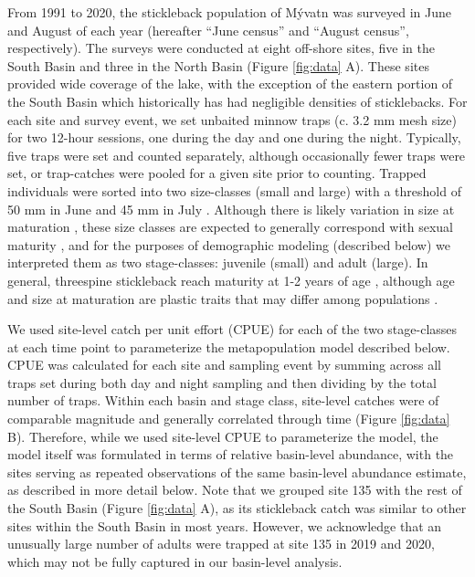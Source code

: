 \documentclass[11pt]{article}
\begin{document}
From 1991 to 2020, 
the stickleback population of M\'{y}vatn was surveyed in June and August of each year
(hereafter ``June census'' and ``August census'', respectively). 
The surveys were conducted at eight off-shore sites, 
five in the South Basin and three in the North Basin
(Figure \ref{fig:data} A).
These sites provided wide coverage of the lake,
with the exception of the eastern portion of the South Basin 
which historically has had negligible densities of sticklebacks.
For each site and survey event, 
we set unbaited minnow traps (c. 3.2 mm mesh size) for two 12-hour sessions, 
one during the day and one during the night. 
Typically, five traps were set and counted separately, 
although occasionally fewer traps were set,
or trap-catches were pooled for a given site prior to counting.
Trapped individuals were sorted into two size-classes (small and large)
with a threshold of 50 mm in June and 45 mm in July \citep{gislason1998}. 
Although there is likely variation in size at maturation \citep{singkam2019},
these size classes are expected to generally correspond with sexual maturity 
\citep{gudmundsson1996, gislason1998},
and for the purposes of demographic modeling (described below) 
we interpreted them as two stage-classes: juvenile (small) and adult (large).
In general, threespine stickleback reach maturity at 1-2 years of age
\citep{baker2008overview},
although age and size at maturation are plastic traits \citep{baker2015life}
that may differ among populations \citep{snyder1991migration}.

We used site-level catch per unit effort (CPUE) for each of the two stage-classes 
at each time point to parameterize the metapopulation model described below. 
CPUE was calculated for each site and sampling event 
by summing across all traps set during both day and night sampling
and then dividing by the total number of traps.
Within each basin and stage class, 
site-level catches were of comparable magnitude and 
generally correlated through time (Figure \ref{fig:data} B).
Therefore, while we used site-level CPUE to parameterize the model, 
the model itself was formulated in terms of relative basin-level abundance,
with the sites serving as repeated observations of the same basin-level abundance estimate,
as described in more detail below.
Note that we grouped site 135 with the rest of the South Basin (Figure \ref{fig:data} A), 
as its stickleback catch was similar to other sites within the South Basin in most years.
However, 
we acknowledge that an unusually large number of adults were trapped at site 135
in 2019 and 2020, which may not be fully captured in our basin-level analysis.
\end{document}
